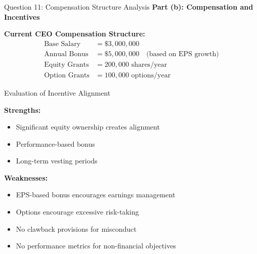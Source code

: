 \documentclass[aspectratio=169]{beamer}
\newcommand{\question}[1]{{\large\bfseries\color{crimson}#1}}
\begin{document}
	\begin{frame}{Question 11: Compensation Structure Analysis}
		\question{Part (b): Compensation and Incentives}
		
		\textbf{Current CEO Compensation Structure:}
		\begin{align*}
			\text{Base Salary} &= \$3,000,000 \\
			\text{Annual Bonus} &= \$5,000,000 \quad \text{(based on EPS growth)} \\
			\text{Equity Grants} &= 200,000 \text{ shares/year} \\
			\text{Option Grants} &= 100,000 \text{ options/year}
		\end{align*}
		
		\begin{block}{Evaluation of Incentive Alignment}
			
			\textbf{Strengths:}
			\begin{itemize}
				\item Significant equity ownership creates alignment
				\item Performance-based bonus
				\item Long-term vesting periods
			\end{itemize}
			
			\textbf{Weaknesses:}
			\begin{itemize}
				\item EPS-based bonus encourages earnings management
				\item Options encourage excessive risk-taking
				\item No clawback provisions for misconduct
				\item No performance metrics for non-financial objectives
			\end{itemize}
		\end{block}
	\end{frame}
	
\end{document}
